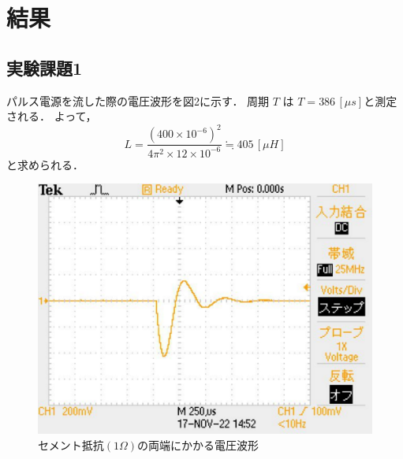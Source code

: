 
\section{結果}

\subsection{実験課題1}
パルス電源を流した際の電圧波形を図2に示す．
周期 $T$ は $T=386\,[\si{\mu s}]$と測定される．
よって，
$$
L=\frac{(400\times10^{-6})^2}{4\pi^2\times12\times10^{-6}}\fallingdotseq 405\,[\mu H]
$$
と求められる．
\begin{figure}[H]
    \begin{center}
        \includegraphics[scale=0.5]{figure2.pdf}
        \caption{セメント抵抗$(1\Omega)$の両端にかかる電圧波形}
    \end{center}
\end{figure}
\newpage

